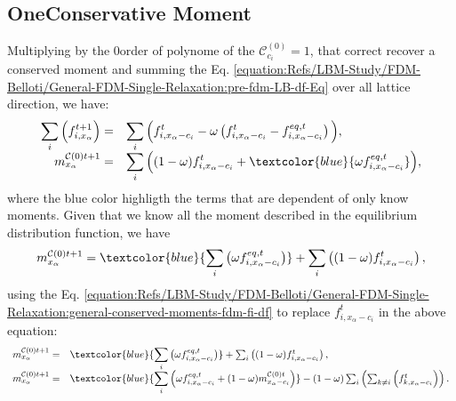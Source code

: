 \documentclass[letterpaper,10pt,english,openany,oneside]{jupyterBook}
\begin{document}
\subsection{One\sphinxhyphen{}Conservative Moment}
\label{\detokenize{Refs/LBM-Study/FDM-Belloti/General-FDM-Single-Relaxation:one-conservative-moment}}
\sphinxAtStartPar
Multiplying by the \(0\)\sphinxhyphen{}order of polynome of the \(\mathcal{C}_{c_{i}}^{(0)}=1\), that correct recover a conserved moment and summing the Eq. \eqref{equation:Refs/LBM-Study/FDM-Belloti/General-FDM-Single-Relaxation:pre-fdm-LB-df-Eq} over all lattice direction, we have:
\begin{equation*}
\begin{split}
\begin{array}{rl}
\displaystyle\sum_{i}\Big( f_{i,x_{\alpha}}^{t+1} \Big) = & \displaystyle\sum_{i}\Big( f_{i,x_{\alpha}-c_{i}}^{t}   - \omega \left( f_{i,x_{\alpha}-c_{i}}^{t}  - f_{i,x_{\alpha}-c_{i}}^{eq,t}  \right) \Big), \\
m_{x_{\alpha}}^{\mathcal{C}(0)t+1} = & \displaystyle\sum_{i}\Big( (1-\omega) f_{i,x_{\alpha}-c_{i}}^{t}   + \textcolor{blue}{\omega f_{i,x_{\alpha}-c_{i}}^{eq,t}  }\Big),
\end{array}
\end{split}
\end{equation*}
\sphinxAtStartPar
where the blue color highligth the terms that are dependent of only know moments. Given that we know all the moment described in the equilibrium distribution function, we have
\begin{equation*}
\begin{split}
m_{x_{\alpha}}^{\mathcal{C}(0)t+1} = \textcolor{blue}{\sum_{i}\left(\omega f_{i,x_{\alpha}-c_{i}}^{eq,t}  \right)} + \sum_{i}\left( (1-\omega) f_{i,x_{\alpha}-c_{i}}^{t}   \right),
\end{split}
\end{equation*}
\sphinxAtStartPar
using the Eq. \eqref{equation:Refs/LBM-Study/FDM-Belloti/General-FDM-Single-Relaxation:general-conserved-moments-fdm-fi-df} to replace \(f_{i,x_{\alpha}-c_{i}}^{t}\) in the above equation:
\begin{equation*}
\begin{split}
\begin{array}{rl}
m_{x_{\alpha}}^{\mathcal{C}(0)t+1} = & \textcolor{blue}{\displaystyle\sum_{i}\left(\omega f_{i,x_{\alpha}-c_{i}}^{eq,t}  \right)} + \sum_{i}\left( (1-\omega) f_{i,x_{\alpha}-c_{i}}^{t}   \right), \\
m_{x_{\alpha}}^{\mathcal{C}(0)t+1} = & \textcolor{blue}{\displaystyle\sum_{i}\left(\omega f_{i,x_{\alpha}-c_{i}}^{eq,t}  + (1-\omega)m_{x_{\alpha}-c_{i}}^{\mathcal{C}(0)t} \right)} - (1-\omega) \sum_{i}\left( \sum_{k\neq i} \left(f_{k,x_{\alpha}-c_{i}}^{t}   \right) \right).
\end{array}
\end{split}
\end{equation*}
\end{document}

